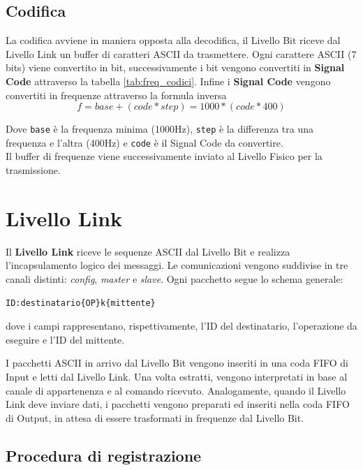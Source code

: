 \subsection{Codifica}
La codifica avviene in maniera opposta alla decodifica, il Livello Bit riceve dal Livello Link un buffer di caratteri ASCII da trasmettere.
Ogni carattere ASCII (7 bits) viene convertito in bit, successivamente i bit vengono convertiti in \textbf{Signal Code} attraverso la tabella \ref{tab:freq_codici}.
Infine i \textbf{Signal Code} vengono convertiti in frequenze attraverso la formula inversa
\begin{equation}
f = base + (code*step) = 1000 * (code*400)
\end{equation}

Dove \texttt{base} è la frequenza minima (1000Hz), \texttt{step} è la differenza tra una frequenza e l'altra (400Hz) e \texttt{code} è il Signal Code da convertire.\\

Il buffer di frequenze viene successivamente inviato al Livello Fisico per la trasmissione.

\section{Livello Link}

Il \textbf{Livello Link} riceve le sequenze ASCII dal Livello Bit e realizza l’incapsulamento logico dei messaggi. 
Le comunicazioni vengono suddivise in tre canali distinti: \emph{config}, \emph{master} e \emph{slave}. 
Ogni pacchetto segue lo schema generale:

\begin{verbatim}
ID:destinatario{OP}k{mittente}
\end{verbatim}

dove i campi rappresentano, rispettivamente, l’ID del destinatario, l’operazione da eseguire e l’ID del mittente.  

I pacchetti ASCII in arrivo dal Livello Bit vengono inseriti in una coda FIFO di Input e letti dal Livello Link. 
Una volta estratti, vengono interpretati in base al canale di appartenenza e al comando ricevuto. 
Analogamente, quando il Livello Link deve inviare dati, i pacchetti vengono preparati ed inseriti nella coda FIFO di Output, in attesa di essere trasformati in frequenze dal Livello Bit.

\subsection{Procedura di registrazione}

